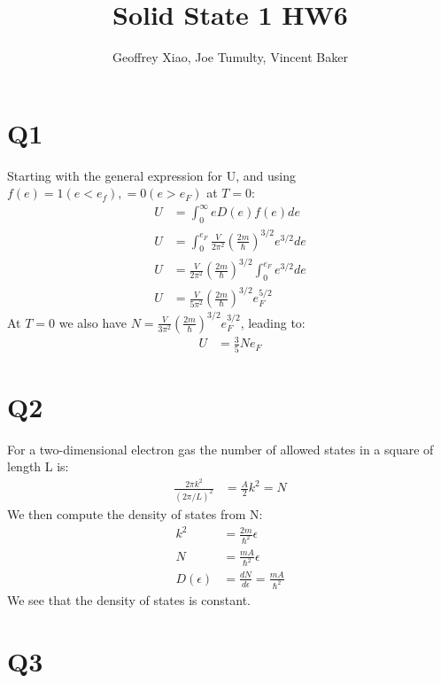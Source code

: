 \documentclass[a4paper,11pt]{article}
\title{Solid State 1 HW6}
\author{Geoffrey Xiao, Joe Tumulty, Vincent Baker}
\numberwithin{equation}{section}
\newcommand{\lrp}[1]{\left({#1}\right)}
\begin{document}
\maketitle

\section*{Q1}
Starting with the general expression for U, and using $f(e)=1 (e<e_f), =0(e>e_F)$ at $T=0$:
\begin{align}
 U &= \int_0^\infty eD(e)f(e)de \\
 U &= \int_0^{e_F} \frac{V}{2\pi^2}\lrp{\frac{2m}{\hbar}}^{3/2}e^{3/2}de\\
 U &= \frac{V}{2\pi^2}\lrp{\frac{2m}{\hbar}}^{3/2}\int_0^{e_F}e^{3/2}de \\
 U &= \frac{V}{5\pi^2}\lrp{\frac{2m}{\hbar}}^{3/2}e_F^{5/2}
\end{align}
At $T=0$ we also have $N=\frac{V}{3\pi^2}\lrp{\frac{2m}{\hbar}}^{3/2}e_F^{3/2}$, leading to:
\begin{align}
 U &= \frac{3}{5}Ne_F
\end{align}

\section*{Q2}
For a two-dimensional electron gas the number of allowed states in a square of length L is:
\begin{align}
  \frac{2\pi k^2}{\lrp{2\pi/L}^2} &= \frac{A}{2}k^2 = N
\end{align}
 We then compute the density of states from N:
\begin{align}
 k^2 &= \frac{2m}{\hbar^2}\epsilon\\
 N &= \frac{mA}{\hbar^2}\epsilon\\
 D(\epsilon) &= \frac{dN}{d\epsilon} = \frac{mA}{\hbar^2}
\end{align}
We see that the density of states is constant.

\section*{Q3}
\end{document}
